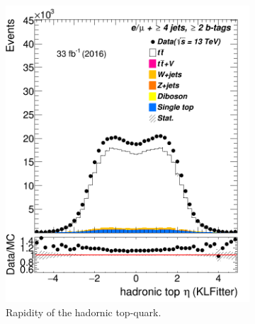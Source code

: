 \begin{figure}
\begin{subfigure}{0.35\textwidth}
		\includegraphics[width=\linewidth]{ControlPlots_emujets_2016_4incl_2incl/klf_topHad_eta_emujets_2016.png}
		\caption{Rapidity of the hadornic top-quark.} \label{fig:20}
	\end{subfigure}
	\medskip
	\begin{subfigure}{0.35\textwidth}

\end{subfigure}
\end{figure}
